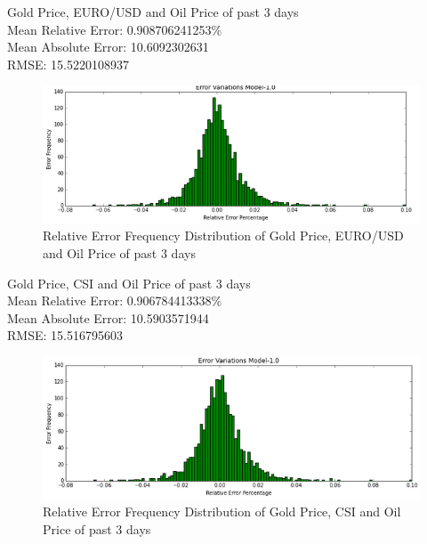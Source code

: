 \documentclass[runningheads]{llncs}
\begin{document}
\noindent Gold Price, EURO/USD and Oil Price of past 3 days \\
Mean Relative Error: 0.908706241253\% \\
Mean Absolute Error:  10.6092302631 \\
RMSE: 15.5220108937 \\
\begin{figure}
\centering
\includegraphics[width=\textwidth]{GoldEuroOil_Daily.png}
\caption{Relative Error Frequency Distribution of Gold Price, EURO/USD and Oil Price of past 3 days}
\label{fig:GoldEuroOil_Daily.png}
\end{figure}

\noindent Gold Price, CSI and Oil Price of past 3 days \\
Mean Relative Error: 0.906784413338\% \\
Mean Absolute Error: 10.5903571944 \\
RMSE: 15.516795603 \\
\begin{figure}
\centering
\includegraphics[width=\textwidth]{GoldCSIOil_Daily.png}
\caption{Relative Error Frequency Distribution of Gold Price, CSI and Oil Price of past 3 days}
\label{fig:GoldCSIOil_Daily.png}
\end{figure}
\end{document}
